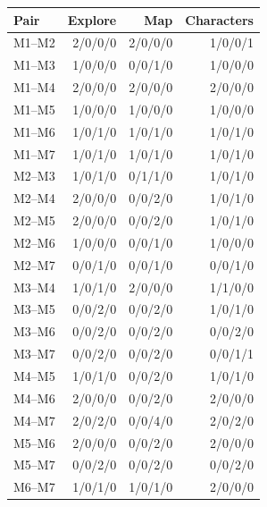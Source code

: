 \begin{tabular}{@{}lrrr@{}}
\toprule
Pair & Explore & Map & Characters \\
\midrule
M1--M2 & 2/0/0/0 & 2/0/0/0 & 1/0/0/1 \\
M1--M3 & 1/0/0/0 & 0/0/1/0 & 1/0/0/0 \\
M1--M4 & 2/0/0/0 & 2/0/0/0 & 2/0/0/0 \\
M1--M5 & 1/0/0/0 & 1/0/0/0 & 1/0/0/0 \\
M1--M6 & 1/0/1/0 & 1/0/1/0 & 1/0/1/0 \\
M1--M7 & 1/0/1/0 & 1/0/1/0 & 1/0/1/0 \\
M2--M3 & 1/0/1/0 & 0/1/1/0 & 1/0/1/0 \\
M2--M4 & 2/0/0/0 & 0/0/2/0 & 1/0/1/0 \\
M2--M5 & 2/0/0/0 & 0/0/2/0 & 1/0/1/0 \\
M2--M6 & 1/0/0/0 & 0/0/1/0 & 1/0/0/0 \\
M2--M7 & 0/0/1/0 & 0/0/1/0 & 0/0/1/0 \\
M3--M4 & 1/0/1/0 & 2/0/0/0 & 1/1/0/0 \\
M3--M5 & 0/0/2/0 & 0/0/2/0 & 1/0/1/0 \\
M3--M6 & 0/0/2/0 & 0/0/2/0 & 0/0/2/0 \\
M3--M7 & 0/0/2/0 & 0/0/2/0 & 0/0/1/1 \\
M4--M5 & 1/0/1/0 & 0/0/2/0 & 1/0/1/0 \\
M4--M6 & 2/0/0/0 & 0/0/2/0 & 2/0/0/0 \\
M4--M7 & 2/0/2/0 & 0/0/4/0 & 2/0/2/0 \\
M5--M6 & 2/0/0/0 & 0/0/2/0 & 2/0/0/0 \\
M5--M7 & 0/0/2/0 & 0/0/2/0 & 0/0/2/0 \\
M6--M7 & 1/0/1/0 & 1/0/1/0 & 2/0/0/0 \\
\bottomrule
\end{tabular}
